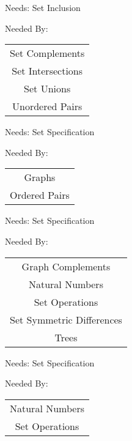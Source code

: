 \newpage
\label{set_specification}


\clearpage
Needs:  Set Inclusion 

Needed By: \begin{tabular}{c} Set Complements \\  Set Intersections \\  Set Unions \\  Unordered Pairs \\ 
\end{tabular}
\clearpage{}

\newpage
\label{unordered_pairs}


\clearpage
Needs:  Set Specification 

Needed By: \begin{tabular}{c} Graphs \\  Ordered Pairs \\ 
\end{tabular}
\clearpage{}

\newpage
\label{set_unions}


\clearpage
Needs:  Set Specification 

Needed By: \begin{tabular}{c} Graph Complements \\  Natural Numbers \\  Set Operations \\  Set Symmetric Differences \\  Trees \\ 
\end{tabular}
\clearpage{}

\newpage
\label{set_intersections}


\clearpage
Needs:  Set Specification 

Needed By: \begin{tabular}{c} Natural Numbers \\  Set Operations \\ 
\end{tabular}
\clearpage{}

